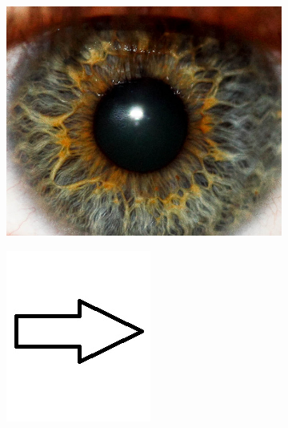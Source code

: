 \documentclass{article}
\begin{document}
\begin{figure}[H]
\begin{subfigure}{.47\textwidth}
  \centering
  \includegraphics[width=0.97\linewidth]{_Figures/raw_data_3.jpg}
  \caption{}
  \label{fig:raw_3}
\end{subfigure}%
\begin{subfigure}{.09\textwidth}
  \centering
  \includegraphics[width=0.97\linewidth]{_Figures/leftrightarrow.jpg}

\end{subfigure}
\end{figure}
\end{document}
